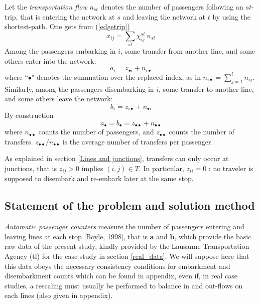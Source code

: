 \documentclass{bmcart}
\begin{document}
\vspace*{0.1cm}

Let the \emph{transportation flow} $n_{st}$ denotes the number of passengers following an $st$-trip, that is entering the network at $s$ and leaving the network at $t$ by using the shortest-path. One gets from (\ref{edgetrip}) 
\begin{equation}
\label{equationGG}
x_{ij}=\sum_{st}\chi_{ij}^{st}\:  n_{st}
\end{equation}
Among the passengers embarking in $i$, some transfer from another line, and some others enter into the network: 
\begin{equation}
\label{entrer}
a_i=z_{\bullet i}+n_{i\bullet}
\end{equation}
where  ``$\bullet$" denotes the summation over the replaced index, as in $n_{i\bullet}=\sum_{j=1}^l n_{ij}$. Similarly, among the passengers disembarking in $i$, some transfer to another line, and some others leave the network: 
\begin{equation}
\label{sortir}
b_i=z_{i\bullet}+n_{\bullet i}
\end{equation}
By construction
\begin{displaymath}
a_{\bullet}=b_{\bullet}=z_{\bullet\bullet}+n_{\bullet\bullet}
\end{displaymath}
where $n_{\bullet\bullet}$ counts the number of passengers, and $z_{\bullet\bullet}$ counts the number of transfers. $z_{\bullet\bullet}/n_{\bullet\bullet}$  is the average number of transfers per passenger. 

\vspace*{0.1cm}



As explained in section \ref{Lines and junctions}, transfers can only occur at junctions, that is $z_{ij}>0$ implies $(i, j) \in T$. In particular,  $z_{ii}=0$ : no traveler is supposed to disembark and re-embark later at the same stop. 


 
\subsection{Statement of the problem and solution method}
\emph{Automatic passenger counters} measure the number of passengers entering and leaving lines at each stop [Boyle, 1998], that is $\mathbf{a}$ and $\mathbf{b}$, which provide the basic raw data of the present study, kindly provided by the Lausanne Transportation Agency (tl) for the case study in section \ref{real_data}. We will suppose here that this data obeys the necessary consistency conditions for embarkment and disembarkment counts which can be found in appendix, even if, in real case studies, a rescaling must usually be performed to balance in and out-flows on each lines (also given in appendix).
\end{document}

